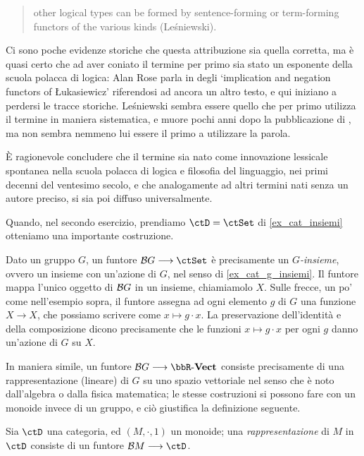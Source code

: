 \begin{terminology}
\begin{quotation}
		other logical types can be formed by sentence-forming or term-forming functors of the various kinds (Leśniewski).
	\end{quotation}
	Ci sono poche evidenze storiche che questa attribuzione sia quella corretta, ma è quasi certo che ad aver coniato il termine per primo sia stato un esponente della scuola polacca di logica: Alan Rose parla in \cite{CM_1968__20__153_0} degli `implication and negation functors of Łukasiewicz' riferendosi ad ancora un altro testo, e qui iniziano a perdersi le tracce storiche. Leśniewski sembra essere quello che per primo utilizza il termine in maniera sistematica, e muore pochi anni dopo la pubblicazione di \cite{carnappio}, ma non sembra nemmeno lui essere il primo a utilizzare la parola.

	\`E ragionevole concludere che il termine sia nato come innovazione lessicale spontanea nella scuola polacca di logica e filosofia del linguaggio, nei primi decenni del ventesimo secolo, e che analogamente ad altri termini nati senza un autore preciso, si sia poi diffuso universalmente.
\end{terminology}
Quando, nel secondo esercizio, prendiamo \(\ctD=\ctSet\) di \ref{ex_cat_insiemi} otteniamo una importante costruzione.
\begin{example}\label{exa_azioni_funtori}
	Dato un gruppo \(G\), un funtore \(\susp G\fun\ctSet\) è precisamente un \emph{\(G\)-insieme}, ovvero un insieme con un'azione di \(G\), nel senso di \ref{ex_cat_g_insiemi}.
	Il funtore mappa l'unico oggetto di \(\mathcal{B} G\) in un insieme, chiamiamolo \(X\).
	Sulle frecce, un po' come nell'esempio sopra, il funtore assegna ad ogni elemento \(g\) di \(G\) una funzione \(X\to X\), che possiamo scrivere come \(x\mapsto g\cdot x\).
	La preservazione dell'identità e della composizione dicono precisamente che le funzioni \(x\mapsto g\cdot x\) per ogni \(g\) danno un'azione di \(G\) su \(X\).

\end{example}
In maniera simile, un funtore \(\susp G\fun\ctVect[\bbR]\) consiste precisamente di una rappresentazione (lineare) di \(G\) su uno spazio vettoriale nel senso che è noto dall'algebra o dalla fisica matematica; le stesse costruzioni si possono fare con un monoide invece di un gruppo, e ciò giustifica la definizione seguente.
\begin{definition}[Rappresentazione di \(M\)]\label{es_fun_repre}
	Sia \(\ctD\) una categoria, ed \((M,\cdot,1)\) un monoide; una \emph{rappresentazione} di \(M\) in \(\ctD\) consiste di un funtore \(\susp M \fun \ctD\).
\end{definition}
